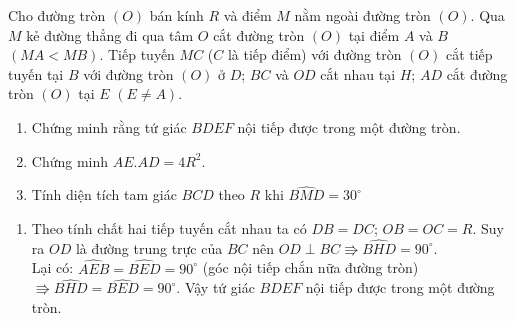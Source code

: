 \begin{ex}%
    Cho đường tròn $(O)$ bán kính $R$ và điểm $M$ nằm ngoài đường tròn $(O)$. Qua $M$ kẻ đường thẳng đi qua tâm $O$ cắt đường tròn $(O)$ tại điểm $A$ và $B$ $(MA<MB)$. Tiếp tuyến $MC$ ($C$ là tiếp điểm) với đường tròn $(O)$ cắt tiếp tuyến tại $B$ với đường tròn $(O)$ ở $D$; $BC$ và $OD$ cắt nhau tại $H$; $AD$ cắt đường tròn $(O)$ tại $E$ $(E\neq A)$. 
    \begin{enumerate}
        \item Chứng minh rằng tứ giác $BDEF$ nội tiếp được trong một đường tròn.
        \item Chứng minh $AE.AD=4R^2$.
        \item Tính diện tích tam giác $BCD$ theo $R$ khi $\widehat{BMD}=30^\circ$ 
    \end{enumerate}
\loigiai
    {
  \begin{center}
  \end{center}

    \begin{enumerate}
        \item Theo tính chất hai tiếp  tuyến cắt nhau ta có $DB=DC$; $OB=OC=R$. Suy ra $OD$ là đường trung trực của $BC$ nên $OD\perp BC\Rrightarrow \widehat{BHD}=90^\circ$.\\
        Lại có: $\widehat{AEB}=\widehat{BED}=90^\circ$ (góc nội tiếp chắn nữa đường tròn) $\Rrightarrow\widehat{BHD}=\widehat{BED}=90^\circ$. Vậy tứ giác $BDEF$ nội tiếp được trong một đường tròn.
      

\end{enumerate}}
\end{ex}
